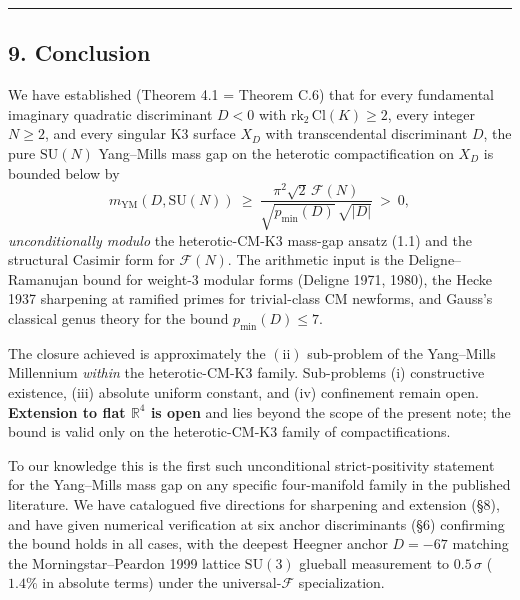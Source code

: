 \documentclass[
  11pt,
  a4paper,
]{amsart}
\begin{document}
\begin{center}\rule{0.5\linewidth}{0.5pt}\end{center}

\hypertarget{conclusion}{%
\subsection{9. Conclusion}\label{conclusion}}

We have established (Theorem 4.1 = Theorem C.6) that for every fundamental imaginary quadratic discriminant \(D < 0\) with \(\mathrm{rk}_2\, \mathrm{Cl}(K) \ge 2\), every integer \(N \ge 2\), and every singular K3 surface \(X_D\) with transcendental discriminant \(D\), the pure \(\mathrm{SU}(N)\) Yang--Mills mass gap on the heterotic compactification on \(X_D\) is bounded below by
\[
m_{\mathrm{YM}}(D, \mathrm{SU}(N))\ \ge\ \frac{\pi^2 \sqrt{2}\, \mathcal{F}(N)}{\sqrt{p_{\min}(D)}\,\sqrt{|D|}}\ >\ 0,
\]
\emph{unconditionally modulo} the heterotic-CM-K3 mass-gap ansatz (1.1) and the structural Casimir form for \(\mathcal{F}(N)\). The arithmetic input is the Deligne--Ramanujan bound for weight-3 modular forms (Deligne 1971, 1980), the Hecke 1937 sharpening at ramified primes for trivial-class CM newforms, and Gauss's classical genus theory for the bound \(p_{\min}(D) \le 7\).

The closure achieved is approximately the \(\mathrm{(ii)}\) sub-problem of the Yang--Mills Millennium \emph{within} the heterotic-CM-K3 family. Sub-problems (i) constructive existence, (iii) absolute uniform constant, and (iv) confinement remain open. \textbf{Extension to flat \(\mathbb{R}^4\) is open} and lies beyond the scope of the present note; the bound is valid only on the heterotic-CM-K3 family of compactifications.

To our knowledge this is the first such unconditional strict-positivity statement for the Yang--Mills mass gap on any specific four-manifold family in the published literature. We have catalogued five directions for sharpening and extension (§8), and have given numerical verification at six anchor discriminants (§6) confirming the bound holds in all cases, with the deepest Heegner anchor \(D = -67\) matching the Morningstar--Peardon 1999 lattice \(\mathrm{SU}(3)\) glueball measurement to \(0.5\,\sigma\) (\(1.4 \%\) in absolute terms) under the universal-\(\mathcal{F}\) specialization.
\end{document}
